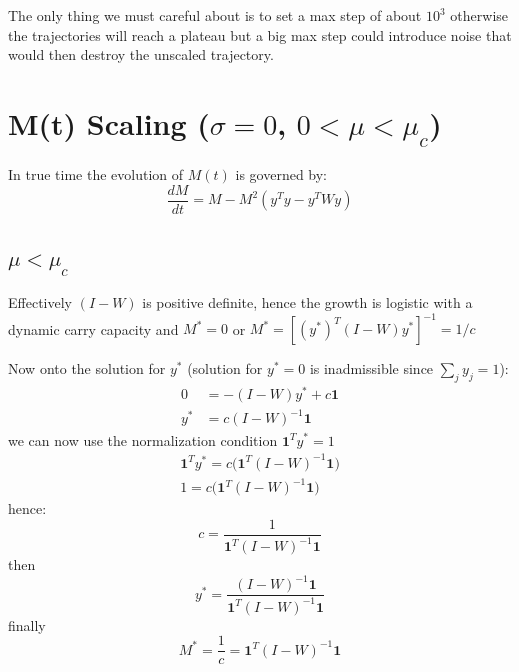 \vspace{10pt}
The only thing we must careful about is to set a max step of about $10^3$ otherwise the trajectories will reach a plateau but a big max step could introduce noise that would then destroy the unscaled trajectory.

\section{M(t) Scaling ($\sigma = 0$, $0<\mu<\mu_c$)}

In true time the evolution of $M(t)$ is governed by:
\begin{equation}
    \frac{dM}{dt} = M - M^2(y^Ty - y^T Wy)
\end{equation}

\subsection{$\mu < \mu_c$}

Effectively $(I - W)$ is positive definite, hence the growth is logistic with a dynamic carry capacity and $M^* = 0$ or $M^* = \left[(y^*)^T(I-W)y^*\right]^{-1} = 1/c$

Now onto the solution for $y^*$ (solution for $y^*=0$ is inadmissible since $\sum_j y_j = 1$):
\begin{equation}
    \begin{aligned}
    0 &= -(I - W)y^* + c\mathbf{1} \\
    y^* &= c (I - W)^{-1} \mathbf{1}
    \end{aligned}
\end{equation}
we can now use the normalization condition $\mathbf{1}^T y^* = 1$
\begin{equation}
\begin{aligned}
        \mathbf{1}^T y^* = c \Big( \mathbf{1}^T (I - W)^{-1} \mathbf{1} \Big) \\
        1 = c \Big( \mathbf{1}^T (I - W)^{-1} \mathbf{1} \Big)
\end{aligned}
\end{equation}
hence:
\begin{equation}
    c = \frac{1}{\mathbf{1}^T (I - W)^{-1} \mathbf{1}}
\end{equation}
then
\begin{equation}
   y^* = \frac{(I - W)^{-1} \mathbf{1}}{\mathbf{1}^T (I - W)^{-1} \mathbf{1}}
\end{equation}
finally
\begin{equation}
    M^* = \frac{1}{c} = \mathbf{1}^T (I - W)^{-1} \mathbf{1}
\end{equation}

